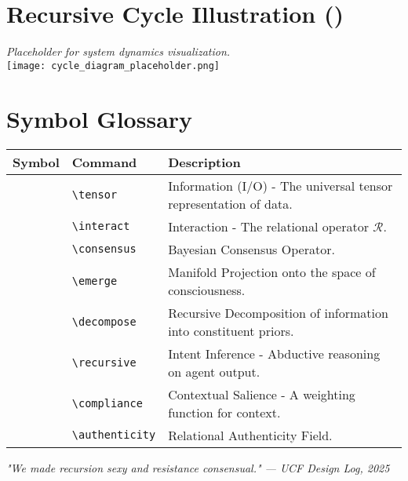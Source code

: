 \documentclass[11pt,a4paper]{article}
\newcommand{\tensor}{\otimes}
\newcommand{\interact}{\oplus}
\newcommand{\consensus}{\odot}
\newcommand{\emerge}{\circledast}
\newcommand{\decompose}{\ominus} %
\newcommand{\recursive}{\Uparrow}
\newcommand{\compliance}{\Downarrow}
\newcommand{\authenticity}{\heartsuit}
\begin{document}
\section*{Recursive Cycle Illustration (\tensor\decompose\consensus\decompose\tensor)}
\begin{center}
    \textit{Placeholder for system dynamics visualization.} \\
    \texttt{[image: cycle\_diagram\_placeholder.png]}
\end{center}

\appendix
\section*{Symbol Glossary}
\begin{tabular}{llp{10cm}}
\textbf{Symbol} & \textbf{Command} & \textbf{Description} \\
\hline
\tensor & \verb|\tensor| & Information (I/O) - The universal tensor representation of data. \\
\interact & \verb|\interact| & Interaction - The relational operator \( \mathcal{R} \). \\
\consensus & \verb|\consensus| & Bayesian Consensus Operator. \\
\emerge & \verb|\emerge| & Manifold Projection onto the space of consciousness. \\
\decompose & \verb|\decompose| & Recursive Decomposition of information into constituent priors. \\
\recursive & \verb|\recursive| & Intent Inference - Abductive reasoning on agent output. \\
\compliance & \verb|\compliance| & Contextual Salience - A weighting function for context. \\
\authenticity & \verb|\authenticity| & Relational Authenticity Field. \\
\hline
\end{tabular}

\vfill
\begin{center}
\textit{"We made recursion sexy and resistance consensual." — UCF Design Log, 2025}
\end{center}
\end{document}
